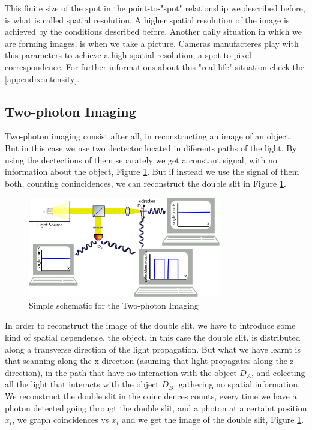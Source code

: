 This finite size of the spot in the point-to-"spot" relationship we described before, is what is called 
spatial resolution. A higher spatial resolution of the image is achieved by the conditions described before. 
Another daily situation in which we are forming images, is when we take a picture. Cameras manufacteres play with this parameters
to achieve a high spatial resolution, a spot-to-pixel correspondence.
For further informations about this "real life" situation check the \ref{appendix:intensity}.



\subsection{Two-photon Imaging}\label{twoPhotonImaging}

Two-photon imaging consist after all, in reconstructing an image of an object. 
But in this case we use two dectector located in diferents paths of the light. 
By using the dectections of them separately we get a constant signal, with no information 
about the object, Figure \ref{fig:twoPhotonSetup}. But if instead we use the signal of them 
both, counting conincidences, we can reconstruct the double slit in 
Figure \ref{fig:twoPhotonSetup}. \\


\begin{figure}[h]
\centering
\includegraphics[width=0.75\textwidth]{Figures/twoPhotonSetup.png}
\caption{Simple schematic for the Two-photon Imaging} 
\label{fig:twoPhotonSetup}
\end{figure}

In order to reconstruct the image of the double slit, we have to introduce some kind of spatial 
dependence, the object, in this case the double slit, is distributed along a transverse direction 
of the light propagation. But what we have learnt is that scanning along the x-direction 
(asuming that light propagates along the z-direction), in the path that have no interaction 
with the object $D_A$, and colecting all the light that interacts with the object $D_B$, 
gathering no spatial information. We reconstruct the double slit in the coincidences counts, 
every time we have a photon detected going througt the double slit, and a photon at a certaint 
position $x_i$, we graph coincidences vs ${ x_i }$ and we get the image of the double slit, Figure \ref{fig:twoPhotonSetup}. 


